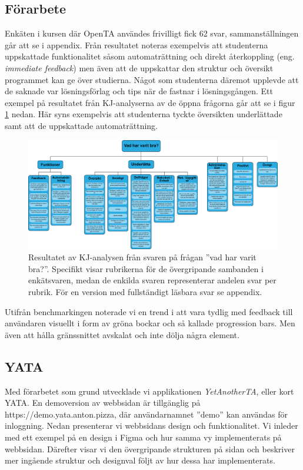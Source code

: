 \subsection{Förarbete}
Enkäten i kursen där OpenTA användes frivilligt fick 62 svar, sammanställningen går att se i appendix. Från resultatet noteras exempelvis att studenterna uppskattade funktionalitet såsom automaträttning och direkt återkoppling (eng. \emph{immediate feedback}) men även att de uppskattar den struktur och översikt programmet kan ge över studierna. Något som studenterna däremot upplevde att de saknade var lösningsförlag och tips när de fastnar i lösningsgången. Ett exempel på resultatet från KJ-analyserna av de öppna frågorna går att se i figur \ref{fig:raket1} nedan. Här syns exempelvis att studenterna tyckte översikten underlättade samt att de uppskattade automaträttning. 
\begin{center}
\begin{figure}[H]
    \centering
    \includegraphics[width=1.0\textwidth]{images/resultpictures/opentakj.png}
    \caption{Resultatet av KJ-analysen från svaren på frågan ''vad har varit bra?''. Specifikt visar rubrikerna för de övergripande sambanden i enkätsvaren, medan de enkilda svaren representerar andelen svar per rubrik. För en version med fullständigt läsbara svar se appendix.}
    \label{fig:raket1}
\end{figure}
\end{center}

Utifrån benchmarkingen noterade vi en trend i att vara tydlig med feedback till användaren visuellt i form av gröna bockar och så kallade progression bars. Men även att hålla gränssnittet avskalat och inte dölja några element. 

\subsection{YATA}
Med förarbetet som grund utvecklade vi applikationen \emph{YetAnotherTA}, eller kort YATA. En demoversion av webbsidan är tillgänglig på https://demo.yata.anton.pizza, där användarnamnet ''demo'' kan användas för inloggning. Nedan presenterar vi webbsidans design och funktionalitet. Vi inleder med ett exempel på en design i Figma och hur samma vy implementerats på webbsidan. Därefter visar vi den övergripande strukturen på sidan och beskriver mer ingående struktur och designval följt av hur dessa har implementerats.   

